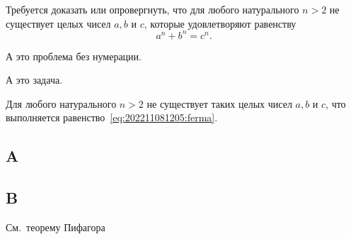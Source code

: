 \documentclass[example-notes.tex]{subfiles}
\begin{document}

    \begin{problem}
        \label{prlm:202211081205}
        Требуется доказать или опровергнуть, что для любого натурального $n>2$ не существует целых чисел $a,b$ и $c$, которые удовлетворяют равенству
        \begin{equation}
            \label{eq:202211081205:ferma}
            a^n+b^n=c^n.
        \end{equation}
    \end{problem}

    \begin{problem*}
        А это проблема без нумерации.
    \end{problem*}

    \begin{task}
        \label{task:202211081205}
        А это задача.
    \end{task}

    \begin{theorem}
        \label{thm:202211081205}
        Для любого натурального $n>2$ не существует таких целых чисел $a,b$ и $c$, что выполняется равенство~\eqref{eq:202211081205:ferma}.
    \end{theorem}

    \Blindtext

    \subsection{A}
    \label{subsec:202211081205:a}
    \Blindtext
    \begin{lemma}
        \label{lem:202211081205}
        \blindtext
    \end{lemma}

   \subsection{B}\label{subsec:202211081205:b}
    \Blindtext

    \seealso
    См.~теорему Пифагора~
\end{document}
